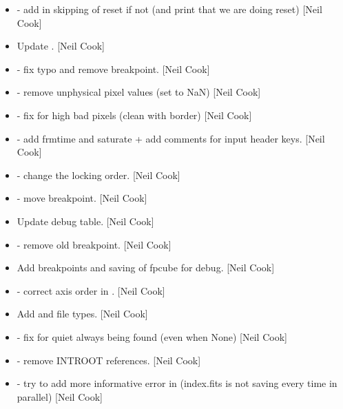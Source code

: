\documentclass[a4paper,10pt,english]{report}
\begin{document}
\begin{itemize}
\item {} 
 - add in skipping of reset if
not  (and print that we are doing reset) {[}Neil Cook{]}

\item {} 
Update . {[}Neil Cook{]}

\item {} 
  - fix typo and remove breakpoint.
{[}Neil Cook{]}

\item {} 
 - remove unphysical pixel values (set to NaN)
{[}Neil Cook{]}

\item {} 
 - fix for high bad pixels (clean with border) {[}Neil
Cook{]}

\item {} 
 - add frmtime and saturate +
add comments for input header keys. {[}Neil Cook{]}

\item {} 
 - change the locking order. {[}Neil Cook{]}

\item {} 
 - move breakpoint. {[}Neil Cook{]}

\item {} 
Update debug table. {[}Neil Cook{]}

\item {} 
 - remove old breakpoint. {[}Neil Cook{]}

\item {} 
Add breakpoints and saving of fpcube for debug. {[}Neil Cook{]}

\item {} 
 - correct axis order in . {[}Neil
Cook{]}

\item {} 
Add  and  file types. {[}Neil Cook{]}

\item {} 
 - fix for quiet always being found (even when
None) {[}Neil Cook{]}

\item {} 
 - remove INTROOT references.
{[}Neil Cook{]}

\item {} 
 - try to add more informative error in 
(index.fits is not saving every time in parallel) {[}Neil Cook{]}

\end{itemize}
\end{document}
